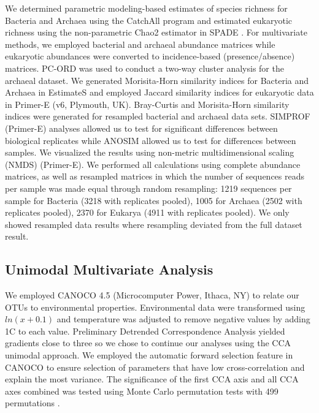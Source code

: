 We determined parametric modeling-based estimates of species richness for Bacteria and Archaea using the CatchAll program \citep{bunge2012estimating} and estimated eukaryotic richness using the non-parametric Chao2 estimator in SPADE \citep{cs10}. For multivariate methods, we employed bacterial and archaeal abundance matrices while eukaryotic abundances were converted to incidence-based (presence/absence) matrices. PC-ORD \citep{p10} was used to conduct a two-way cluster analysis for the archaeal dataset. We generated Morisita-Horn similarity indices for Bacteria and Archaea in EstimateS \citep{c09} and employed Jaccard similarity indices for eukaryotic data in Primer-E (v6, Plymouth, UK). Bray-Curtis and Morisita-Horn similarity indices were generated for resampled bacterial and archaeal data sets. SIMPROF (Primer-E) analyses allowed us to test for significant differences between biological replicates while ANOSIM allowed us to test for differences between samples. We visualized the results using non-metric multidimensional scaling (NMDS) (Primer-E). We performed all calculations using complete abundance matrices, as well as resampled matrices in which the number of sequences reads per sample was made equal through random resampling: 1219 sequences per sample for Bacteria (3218 with replicates pooled), 1005 for Archaea (2502 with replicates pooled), 2370 for Eukarya (4911 with replicates pooled). We only showed resampled data results where resampling deviated from the full dataset result.

\subsection{Unimodal Multivariate Analysis}\label{ssc:unimodal-multivariate-analysis}

We employed CANOCO 4.5 (Microcomputer Power, Ithaca, NY) \citep{Ter-Braak:2002aa} to relate our OTUs to environmental properties. Environmental data were transformed using $ln(x + 0.1)$ and temperature was adjusted to remove negative values by adding 1\textdegree C to each value. Preliminary Detrended Correspondence Analysis yielded gradients close to three so we chose to continue our analyses using the CCA unimodal approach. We employed the automatic forward selection feature in CANOCO to ensure selection of parameters that have low cross-correlation and explain the most variance. The significance of the first CCA axis and all CCA axes combined was tested using Monte Carlo permutation tests with 499 permutations \citep{Ter-Braak:2002aa}.


